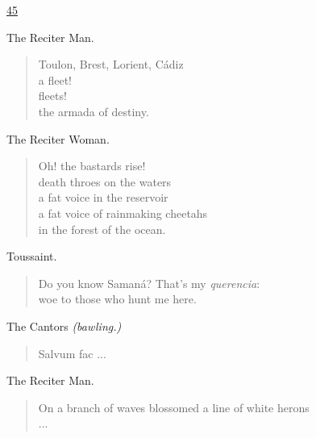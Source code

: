 \documentclass[letterpaper,article,12pt,oneside,notitlepage]{memoir}
\begin{document}
\href{http://cesaire.elotroalex.com/chiens/chiens/p045.html}{45}

\begin{center}The Reciter Man.\end{center}

\begin{verse}
Toulon, Brest, Lorient, Cádiz \\
a fleet! \\
fleets! \\
the armada of destiny. \\
\end{verse}

\begin{center}The Reciter Woman.\end{center}

\begin{verse}
Oh! the bastards rise! \\
death throes on the waters \\
a fat voice in the reservoir \\
a fat voice of rainmaking cheetahs \\
in the forest of the ocean. \\
\end{verse}

\begin{center}Toussaint.\end{center}

\begin{verse}
Do you know Samaná? That's my \textit{querencia}: \\
woe to those who hunt me here. \\
\end{verse}

\begin{center}The Cantors \textit{(bawling.)}\end{center}

\begin{verse}
Salvum fac ... \\
\end{verse}

\begin{center}The Reciter Man.\end{center}

\begin{verse}
On a branch of waves blossomed a line of white herons \\
... \\
\end{verse}
\end{document}
